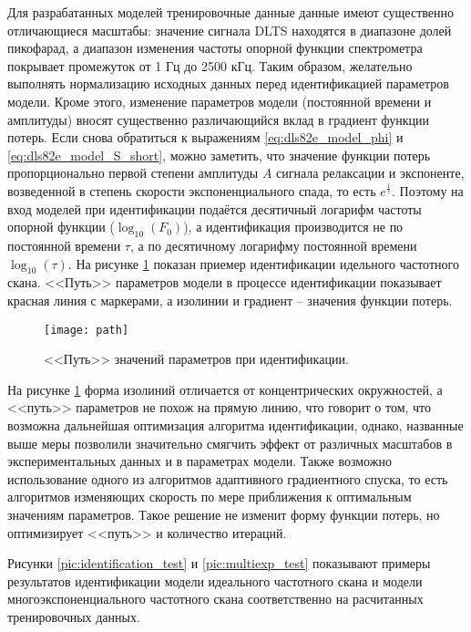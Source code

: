 	Для разрабатанных моделей тренировочные данные данные имеют существенно
	отличающиеся масштабы: значение сигнала DLTS находятся в диапазоне долей
	пикофарад, а диапазон изменения частоты опорной функции спектрометра
	покрывает промежуток от 1 Гц до 2500 кГц. Таким образом, желательно 
	выполнять нормализацию исходных данных перед идентификацией параметров
	модели. Кроме этого, изменение параметров модели (постоянной времени и 
	амплитуды) вносят существенно различающийся вклад в градиент функции потерь.
	Если снова обратиться к выражениям \ref{eq:dls82e_model_phi} и 
	\ref{eq:dls82e_model_S_short}, можно заметить, что значение функции потерь
	пропорционально первой степени амплитуды $A$ сигнала релаксации и экспоненте,
	возведенной в степень скорости экспоненциального спада, то есть
	$e^\frac{1}{\tau}$. Поэтому на вход моделей при идентификации подаётся 
	десятичный логарифм частоты опорной функции ($\log_{10}(F_0)$), а 
	идентификация производится не по постоянной времени $\tau$, а по десятичному
	логарифму постоянной времени $\log_{10}(\tau)$. На рисунке \ref{pic:path}
	показан приемер идентификации идельного частотного скана. <<Путь>> 
	параметров модели в процессе идентификации показывает красная линия с 
	маркерами, а изолинии и градиент -- значения функции потерь.

    \begin{figure}[!htp]
        \centering
        \texttt{[image: path]}
        \caption{<<Путь>> значений параметров при идентификации.}
        \label{pic:path}
    \end{figure}

    На рисунке \ref{pic:path} форма изолиний отличается от концентрических 
    окружностей, а <<путь>> параметров не похож на прямую линию, что говорит
    о том, что возможна дальнейшая оптимизация алгоритма идентификации, однако,
    названные выше меры позволили значительно смягчить эффект от различных 
    масштабов в экспериментальных данных и в параметрах модели. Также возможно
    использование одного из алгоритмов адаптивного градиентного спуска, то есть
    алгоритмов изменяющих скорость по мере приближения к оптимальным значениям
    параметров. Такое решение не изменит форму функции потерь, но оптимизирует
    <<путь>> и количество итераций.

    Рисунки \ref{pic:identification_test} и \ref{pic:multiexp_test} показывают
    примеры результатов идентификации модели идеального частотного скана и 
    модели многоэкспоненциального частотного скана соответственно на 
    расчитанных тренировочных данных.

